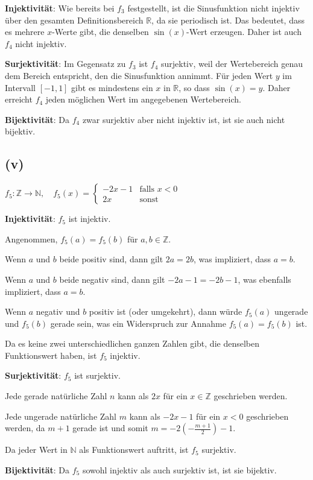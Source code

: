 \documentclass[12pt]{article}
\begin{document}
\textbf{Injektivität}: Wie bereits bei \( f_3 \) festgestellt, ist die Sinusfunktion nicht injektiv über den gesamten Definitionsbereich \( \mathbb{R} \), da sie periodisch ist. Das bedeutet, dass es mehrere \( x \)-Werte gibt, die denselben \( \sin(x) \)-Wert erzeugen. Daher ist auch \( f_4 \) nicht injektiv.

\textbf{Surjektivität}: Im Gegensatz zu \( f_3 \) ist \( f_4 \) surjektiv, weil der Wertebereich genau dem Bereich entspricht, den die Sinusfunktion annimmt. Für jeden Wert \( y \) im Intervall \([-1, 1]\) gibt es mindestens ein \( x \) in \( \mathbb{R} \), so dass \( \sin(x) = y \). Daher erreicht \( f_4 \) jeden möglichen Wert im angegebenen Wertebereich.

\textbf{Bijektivität}: Da \( f_4 \) zwar surjektiv aber nicht injektiv ist, ist sie auch nicht bijektiv.

\subsection*{(v)} \( f_5: \mathbb{Z} \rightarrow \mathbb{N}, \quad f_5(x) = \begin{cases}-2x - 1 & \text{falls } x < 0 \\2x & \text{sonst}\end{cases}\)

\textbf{Injektivität}: \( f_5 \) ist injektiv.

Angenommen, \( f_5(a) = f_5(b) \) für \( a, b \in \mathbb{Z} \).

Wenn \( a \) und \( b \) beide positiv sind, dann gilt \( 2a = 2b \), was impliziert, dass \( a = b \).

Wenn \( a \) und \( b \) beide negativ sind, dann gilt \( -2a -1 = -2b -1 \), was ebenfalls impliziert, dass \( a = b \).

Wenn \( a \) negativ und \( b \) positiv ist (oder umgekehrt), dann würde \( f_5(a) \) ungerade und \( f_5(b) \) gerade sein, was ein Widerspruch zur Annahme \( f_5(a) = f_5(b)\) ist.

Da es keine zwei unterschiedlichen ganzen Zahlen gibt, die denselben Funktionswert haben, ist \( f_5 \) injektiv.

\textbf{Surjektivität}: \( f_5 \) ist surjektiv.

Jede gerade natürliche Zahl \( n \) kann als \( 2x \) für ein \( x \in \mathbb{Z} \) geschrieben werden.

Jede ungerade natürliche Zahl \( m \) kann als \( -2x - 1 \) für ein \( x < 0 \) geschrieben werden, da \( m+1 \) gerade ist und somit \( m = -2(-\frac{m+1}{2}) - 1 \).

Da jeder Wert in \( \mathbb{N} \) als Funktionswert auftritt, ist \( f_5 \) surjektiv.

\textbf{Bijektivität}: Da \( f_5 \) sowohl injektiv als auch surjektiv ist, ist sie bijektiv.
\end{document}
